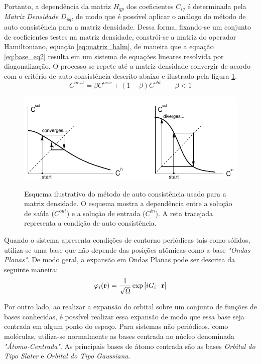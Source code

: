 Portanto, a dependência da matriz $ H_{qp} $ dos coeficientes $ C_{iq} $ é determinada pela \textit{Matriz Densidade} $ D_{pq} $, de modo que é possível aplicar o análogo do método de auto consistência para a matriz densidade. Dessa forma, fixando-se um conjunto de coeficientes testes na matriz densidade, constrói-se a matriz do operador Hamiltoniano, equação \eqref{eq:matriz_halm}, de maneira que a equação \eqref{eq:base_eq2} resulta em um sistema de equações lineares resolvida por diagonalização. O processo se repete até a matriz densidade convergir de acordo com o critério de auto consistência descrito abaixo e ilustrado pela figura \ref{fig:criterio}. 
\begin{equation}
	C^{next}=\beta C^{new}+(1-\beta)C^{old} \qquad \beta<1
\end{equation}
\begin{figure}[H]
	\centering
	\caption{Esquema ilustrativo do método de auto consistência usado para a matriz densidade. O esquema mostra a dependência entre a solução de saída ($ C^{out} $) e a solução de entrada ($ C^{in} $). A reta tracejada representa a condição de auto consistência.}
	\includegraphics[scale=0.6]{figs/criterio.png}
	\label{fig:criterio}
\end{figure}

Quando o sistema apresenta condições de contorno periódicas tais como sólidos, utiliza-se uma base que não depende das posições atômicas como a base \textit{"Ondas Planas"}. De modo geral, a expansão em Ondas Planas pode ser descrita da seguinte maneira:
\begin{equation}
	\varphi_i(\vb{r})=\frac{1}{\sqrt{\Omega}}\exp\bqty{i G_i\cdot \vb{r}}
\end{equation}

Por outro lado, ao realizar a expansão do orbital sobre um conjunto de funções de bases conhecidas, é possível realizar essa expansão de modo que essa base seja centrada em algum ponto do espaço. Para sistemas não periódicos, como moléculas, utiliza-se normalmente as bases centrada no núcleo denominada \textit{"Átomo-Centrada"}. As principais bases de átomo centrada são as bases \textit{Orbital do Tipo Slater} e \textit{Orbital do Tipo Gaussiana}. \cite{book_base}


